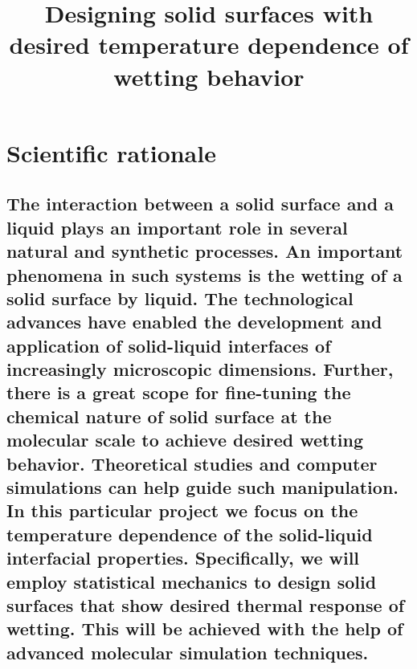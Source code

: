 \documentclass[a4paper,12pt,single,pdftex]{scrartcl}
\title{Designing solid surfaces with desired temperature dependence of wetting behavior}
\begin{document}
 
\maketitle
\newpage

\label{ID_1723255651}\label{ID_268635931}\section{Scientific rationale}

\label{ID_1490725096}\subsection{The interaction between a solid surface and a liquid plays an important role in several natural and synthetic processes. An important phenomena in such systems is the wetting of a solid surface by liquid. The technological advances have enabled the development and application of solid-liquid interfaces  of increasingly microscopic dimensions. Further, there is a great scope for fine-tuning the chemical nature of solid surface at the molecular scale to achieve desired wetting behavior. Theoretical studies and computer simulations can help guide such manipulation. In this particular project we focus on the temperature dependence of the solid-liquid interfacial properties. Specifically, we will employ statistical mechanics to design solid surfaces that show desired thermal response of wetting. This will be achieved with the help of advanced molecular simulation techniques.}
\end{document}
